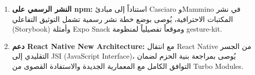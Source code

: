 \begin{Arabic}
\begin{enumerate}
    \item \textbf{النشر الرسمي على \textenglish{npm}:} استناداً إلى مبادئ \textenglish{Casciaro} و\textenglish{Mammino} \cite{casciaro2020} في نشر المكتبات الاحترافية، يُوصى بوضع خطة نشر رسمية تشمل التوثيق التفاعلي (\textenglish{Storybook}) وأمثلة \textenglish{Expo Snack} وموقعاً تفصيلياً لمنظومة \textenglish{gesture-kit}.

    \item \textbf{دعم \textenglish{React Native New Architecture}:} مع انتقال \textenglish{React Native} من الجسر التقليدي إلى \textenglish{JSI (JavaScript Interface)}، يُوصى بمراجعة بنية الحزم لضمان التوافق الكامل مع المعمارية الجديدة والاستفادة القصوى من \textenglish{Turbo Modules}.
\end{enumerate}

\end{Arabic}
